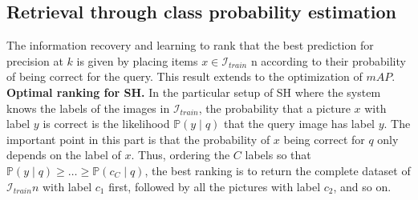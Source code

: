 \documentclass{article}
\begin{document}
\subsection{Retrieval through class probability estimation}


The information recovery \cite{doi:10.1108/eb026647} and learning to rank that the best prediction for precision at $k$ is given by placing items $x \in \mathcal{I}_{train}$ n according to their probability of being correct for the query. This result extends to the optimization of $mAP$.
\\
\textbf{Optimal ranking for SH.} In the particular setup of SH where the system knows the labels of the images in $\mathcal{I}_{train}$, the probability that a picture $x$ with label $y$ is correct is the likelihood $\mathbb{P}(y\mid q)$ that the query image has label $y$. The important point in this part is that the probability of $x$ being correct for $q$ only depends on the label of $x$. Thus, ordering the $C$ labels so that $\mathbb{P}(y\mid q)\geq \dots \geq\mathbb{P}(c_C\mid q)$, the best ranking is to return the complete dataset of $\mathcal{I}_{train}n$ with label $c_1$ first, followed by all the pictures with label $c_2$, and so on.
\\

\end{document}
